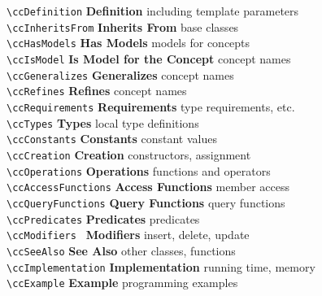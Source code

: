 \documentclass[11pt]{article}
\begin{document}
\begin{tabbing}
  \> \verb+\ccDefinition+      \>  {\bf Definition}    \>
                                          including template parameters\\
  \> \verb+\ccInheritsFrom+    \>  {\bf Inherits From}     \>
                                                     base classes\\
  \> \verb+\ccHasModels+       \>  {\bf Has Models}     \>
                                                     models for concepts\\
  \> \verb+\ccIsModel+         \>  {\bf Is Model for the Concept}     \>
                                                     concept names\\
  \> \verb+\ccGeneralizes+     \>  {\bf Generalizes}     \>
                                                     concept names\\
  \> \verb+\ccRefines+         \>  {\bf Refines}     \>
                                                     concept names\\
  \> \verb+\ccRequirements+    \>  {\bf Requirements}     \>
                                                     type requirements, etc.\\
  \> \verb+\ccTypes+           \>  {\bf Types}         \>
                                                     local type definitions \\
  \> \verb+\ccConstants+       \>  {\bf Constants}     \>
                                                     constant values\\
  \> \verb+\ccCreation+        \>  {\bf Creation}      \>
                                                     constructors, assignment\\
  \> \verb+\ccOperations+      \>  {\bf Operations}    \>
                                                     functions and operators\\
  \> \verb+\ccAccessFunctions+ \>  {\bf Access Functions}    \>
                                                     member access\\
  \> \verb+\ccQueryFunctions+ \>   {\bf Query Functions}    \>
                                                     query functions\\
  \> \verb+\ccPredicates+      \>  {\bf Predicates}    \>
                                                     predicates\\
  \> \verb+\ccModifiers +      \>  {\bf Modifiers}    \>
                                                     insert, delete, update\\
  \> \verb+\ccSeeAlso+         \>  {\bf See Also}\>
                                                     other classes, functions\\
  \> \verb+\ccImplementation+  \>  {\bf Implementation}\>
                                                     running time, memory\\
  \> \verb+\ccExample+         \>  {\bf Example}       \>
                                                     programming examples
\end{tabbing}
\end{document}
